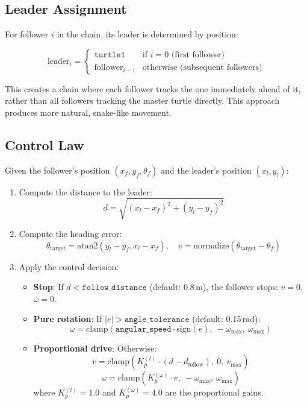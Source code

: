 \subsection{Leader Assignment}

For follower $i$ in the chain, its leader is determined by position:

\[
  \text{leader}_i = \begin{cases} \texttt{turtle1} & \text{if } i = 0 \text{ (first follower)} \\ \text{follower}_{i-1} & \text{otherwise (subsequent followers)} \end{cases}
\]

This creates a chain where each follower tracks the one immediately ahead of it, rather than all followers tracking the master turtle directly. This approach produces more natural, snake-like movement.

\subsection{Control Law}

Given the follower's position $(x_f, y_f, \theta_f)$ and the leader's position $(x_l, y_l)$:

\begin{enumerate}
  \item Compute the distance to the leader:
  \[
    d = \sqrt{(x_l - x_f)^2 + (y_l - y_f)^2}
  \]

  \item Compute the heading error:
  \[
    \theta_{\text{target}} = \text{atan2}(y_l - y_f, x_l - x_f), \quad e = \text{normalize}(\theta_{\text{target}} - \theta_f)
  \]

  \item Apply the control decision:
  \begin{itemize}
    \item \textbf{Stop}: If $d < \texttt{follow\_distance}$ (default: 0.8\,m), the follower stops: $v = 0$, $\omega = 0$.
    \item \textbf{Pure rotation}: If $|e| > \texttt{angle\_tolerance}$ (default: 0.15\,rad):
    \[
      \omega = \text{clamp}(\texttt{angular\_speed} \cdot \text{sign}(e),\ -\omega_{\max},\ \omega_{\max})
    \]
    \item \textbf{Proportional drive}: Otherwise:
    \[
      v = \text{clamp}(K_p^{(l)} \cdot (d - d_{\text{follow}}),\ 0,\ v_{\max})
    \]
    \[
      \omega = \text{clamp}(K_p^{(\omega)} \cdot e,\ -\omega_{\max},\ \omega_{\max})
    \]
    where $K_p^{(l)} = 1.0$ and $K_p^{(\omega)} = 4.0$ are the proportional gains.
  \end{itemize}
\end{enumerate}

